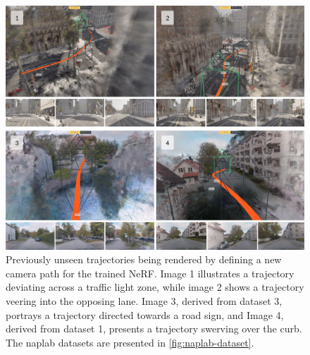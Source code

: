 \begin{figure}[h]
    \centering
    \includegraphics[width=1.0\textwidth]{figures/altered-trajectories.png}
    \caption[Results from experiment 6: Altered trajectories]{Previously unseen trajectories being rendered by defining a new camera path for the trained NeRF. Image 1 illustrates a trajectory deviating across a traffic light zone, while image 2 shows a trajectory veering into the opposing lane. Image 3, derived from dataset 3, portrays a trajectory directed towards a road sign, and Image 4, derived from dataset 1, presents a trajectory swerving over the curb. The \acrshort{naplab} datasets are presented in \autoref{fig:naplab-dataset}.}
    \label{fig:altered-trajectories}
\end{figure}